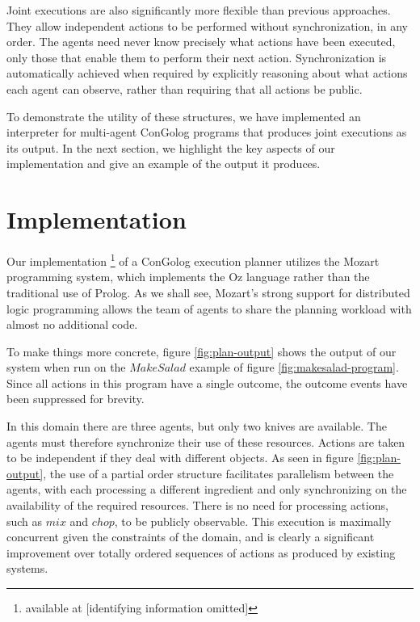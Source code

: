 Joint executions are also significantly more flexible than previous
approaches. They allow independent actions to be performed without
synchronization, in any order. The agents need never know precisely
what actions have been executed, only those that enable them to perform
their next action. Synchronization is automatically achieved when
required by explicitly reasoning about what actions each agent can
observe, rather than requiring that all actions be public.

To demonstrate the utility of these structures, we have implemented
an interpreter for multi-agent ConGolog programs that produces joint
executions as its output. In the next section, we highlight the key
aspects of our implementation and give an example of the output it
produces.


\section{Implementation}

\label{sec:Implementation}

Our implementation%
\footnote{available at {[}identifying information omitted]%
} of a ConGolog execution planner utilizes the Mozart programming system,
which implements the Oz language \citep{vanroy99mozart} rather than
the traditional use of Prolog. As we shall see, Mozart's strong support
for distributed logic programming allows the team of agents to share
the planning workload with almost no additional code. 

To make things more concrete, figure \ref{fig:plan-output} shows
the output of our system when run on the $MakeSalad$ example of figure
\ref{fig:makesalad-program}. Since all actions in this program have
a single outcome, the outcome events have been suppressed for brevity.

In this domain there are three agents, but only two knives are available.
The agents must therefore synchronize their use of these resources.
Actions are taken to be independent if they deal with different objects.
As seen in figure \ref{fig:plan-output}, the use of a partial order
structure facilitates parallelism between the agents, with each processing
a different ingredient and only synchronizing on the availability
of the required resources. There is no need for processing actions,
such as $mix$ and $chop$, to be publicly observable. This execution
is maximally concurrent given the constraints of the domain, and is
clearly a significant improvement over totally ordered sequences of
actions as produced by existing systems.


